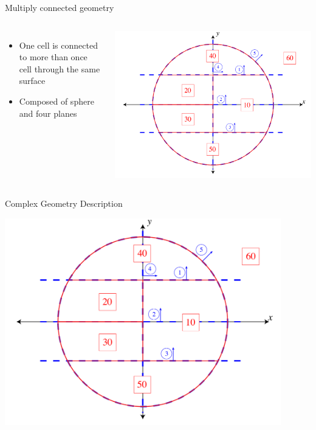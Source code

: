 \documentclass[color={usenames, dvipsnames},ignorenonframetext]{beamer}
\begin{document}
\begin{frame}{Multiply connected geometry}
\begin{columns}[c]
\begin{itemize}
  \item One cell is connected to more than once cell through the same surface
  \item Composed of sphere and four planes
\end{itemize}

    \includegraphics[width=\textwidth, keepaspectratio]{test_geom_1}
\end{columns}
\end{frame}

\begin{frame}{Complex Geometry Description}
  \begin{center}
    \includegraphics[width=0.9\textwidth, keepaspectratio]{test_geom_1}
  \end{center}
\end{frame}
\end{document}
